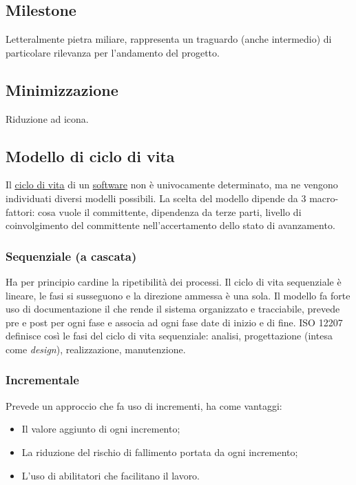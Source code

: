 	
	\subsection{Milestone}
	\label{sec:milestone}	
	Letteralmente pietra miliare, rappresenta un traguardo (anche intermedio) di particolare rilevanza per l'andamento del progetto.
	
	
	\subsection{Minimizzazione}
	\label{sec:minimizzazione}
	Riduzione ad icona.

	
	\subsection{Modello di ciclo di vita}
	\label{sec:modelliciclodivita}
	Il \underline{\hyperref[sec:ciclodivita]{ciclo di vita}} di un \underline{\hyperref[sec:prodottosoftware]{software}} non è univocamente determinato, ma ne vengono individuati diversi modelli possibili. La scelta del modello dipende da 3 macro-fattori: cosa vuole il committente, dipendenza da terze parti, livello di coinvolgimento del committente nell'accertamento dello stato di avanzamento.

		
		\subsubsection{Sequenziale (a cascata)}
			Ha per principio cardine la ripetibilità dei processi.
			Il ciclo di vita sequenziale è lineare, le fasi si susseguono e la direzione ammessa è una sola.
			Il modello fa forte uso di documentazione il che rende il sistema organizzato e tracciabile, prevede pre e post per ogni fase e associa ad ogni fase date di inizio e di fine.
ISO 12207 definisce così le fasi del ciclo di vita sequenziale: analisi, progettazione (intesa come \textit{design}), realizzazione, manutenzione.

		
		\subsubsection{Incrementale}
			Prevede un approccio che fa uso di incrementi, ha come vantaggi:
			\begin{itemize}
			\item Il valore aggiunto di ogni incremento;
			\item La riduzione del rischio di fallimento portata da ogni incremento;
			\item L'uso di abilitatori che facilitano il lavoro.
			\end{itemize}

